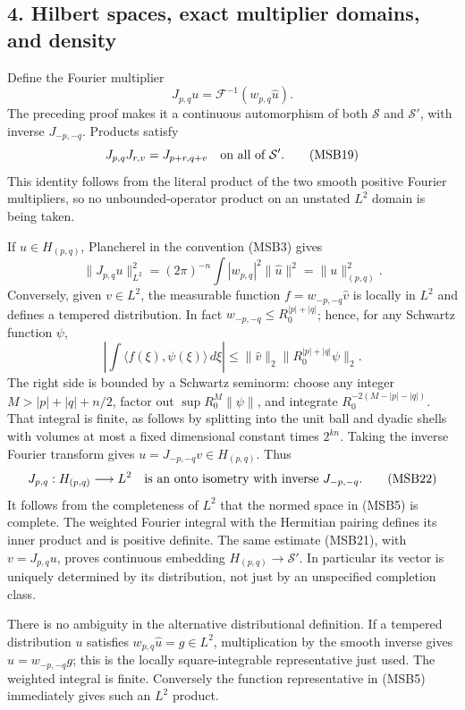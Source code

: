\documentclass[
  11pt,
]{article}
\begin{document}
\subsection{4. Hilbert spaces, exact multiplier domains, and
density}\label{hilbert-spaces-exact-multiplier-domains-and-density}

Define the Fourier multiplier \[
 J_{p,q}u=\mathcal F^{-1}(w_{p,q}\widehat u).
 \tag{MSB18}
\] The preceding proof makes it a continuous automorphism of both
\(\mathcal S\) and \(\mathcal S'\), with inverse \(J_{-p,-q}\). Products
satisfy \[
 J_{p,q}J_{r,v}=J_{p+r,q+v}\quad\hbox{on all of }\mathcal S'.
 \tag{MSB19}
\] This identity follows from the literal product of the two smooth
positive Fourier multipliers, so no unbounded-operator product on an
unstated \(L^2\) domain is being taken.

If \(u\in H_{(p,q)}\), Plancherel in the convention (MSB3) gives \[
 \|J_{p,q}u\|_{L^2}^2=(2\pi)^{-n}\int|w_{p,q}|^2\|\widehat u\|^2
                         =\|u\|_{(p,q)}^2.
 \tag{MSB20}
\] Conversely, given \(v\in L^2\), the measurable function
\(f=w_{-p,-q}\widehat v\) is locally in \(L^2\) and defines a tempered
distribution. In fact \(w_{-p,-q}\leq R_0^{|p|+|q|}\); hence, for any
Schwartz function \(\psi\), \[
 \left|\int\langle f(\xi),\psi(\xi)\rangle\,d\xi\right|
 \leq\|\widehat v\|_2\|R_0^{|p|+|q|}\psi\|_2.
 \tag{MSB21}
\] The right side is bounded by a Schwartz seminorm: choose any integer
\(M>|p|+|q|+n/2\), factor out \(\sup R_0^M\|\psi\|\), and integrate
\(R_0^{-2(M-|p|-|q|)}\). That integral is finite, as follows by
splitting into the unit ball and dyadic shells with volumes at most a
fixed dimensional constant times \(2^{kn}\). Taking the inverse Fourier
transform gives \(u=J_{-p,-q}v\in H_{(p,q)}\). Thus \[
 J_{p,q}:H_{(p,q)}\longrightarrow L^2
 \quad\hbox{is an onto isometry with inverse }J_{-p,-q}.
 \tag{MSB22}
\] It follows from the completeness of \(L^2\) that the normed space in
(MSB5) is complete. The weighted Fourier integral with the Hermitian
pairing defines its inner product and is positive definite. The same
estimate (MSB21), with \(v=J_{p,q}u\), proves continuous embedding
\(H_{(p,q)}\to\mathcal S'\). In particular its vector is uniquely
determined by its distribution, not just by an unspecified completion
class.

There is no ambiguity in the alternative distributional definition. If a
tempered distribution \(u\) satisfies \(w_{p,q}\widehat u=g\in L^2\),
multiplication by the smooth inverse gives \(\widehat u=w_{-p,-q}g\);
this is the locally square-integrable representative just used. The
weighted integral is finite. Conversely the function representative in
(MSB5) immediately gives such an \(L^2\) product.
\end{document}
